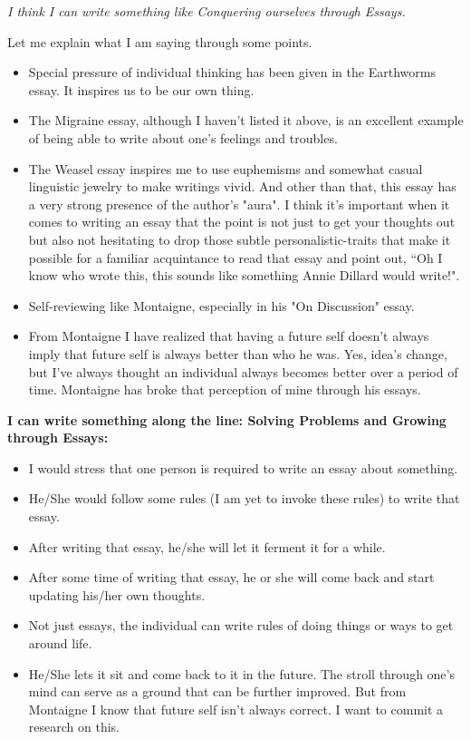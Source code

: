 \documentclass[letter]{article}
\begin{document}
\emph{
I think I can write something like Conquering ourselves through Essays.}

Let me explain what I am saying through some points. 

\begin{itemize}
	\item  Special pressure of individual thinking has been given in the Earthworms essay. It inspires us to be our own thing. 
	\item The Migraine essay, although I haven't listed it above, is an excellent example of being able to write about one's feelings and troubles. 
	\item The Weasel essay inspires me to use euphemisms and somewhat casual linguistic jewelry to make writings vivid. And other than that, this essay has a very strong presence of the author's "aura". I think it's important when it comes to writing an essay that the point is not just to get your thoughts out but also not hesitating to drop those subtle personalistic-traits that make it possible for a familiar acquintance to read that essay and point out, ``Oh I know who wrote this, this sounds like something Annie Dillard would write!". 
	\item Self-reviewing like Montaigne, especially in his "On Discussion" essay. 
	\item From Montaigne I have realized that having a future self doesn't always imply that future self is always better than who he was. Yes, idea's change, but I've always thought an individual always becomes better over a period of time. Montaigne has broke that perception of mine through his essays. 
\end{itemize}



\textbf{I can write something along the line: Solving Problems and Growing through Essays:}

\begin{itemize}
	\item I would stress that one person is required to write an essay about something. 
	\item He/She would follow some rules (I am yet to invoke these rules) to write that essay. 
	\item After writing that essay, he/she will let it ferment it for a while. 
	\item After some time of writing that essay, he or she will come back and start updating his/her own thoughts. 
	\item Not just essays, the individual can write rules of doing things or ways to get around life. 
	\item He/She lets it sit and come back to it in the future. The stroll through one's mind can serve as a ground that can be further improved. But from Montaigne I know that future self isn't always correct. I want to commit a research on this. 
\end{itemize}
\end{document}
